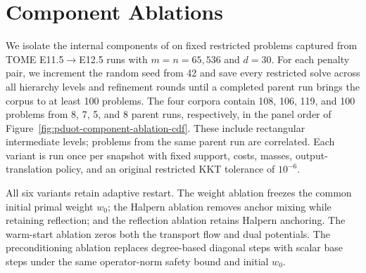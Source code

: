 \section{\subsolver Component Ablations}
\label{app:pduot-component-ablation}
We isolate the internal components of \subsolver on fixed restricted problems captured from TOME E11.5$\to$E12.5 runs with $m=n=65{,}536$ and $d=30$.
For each penalty pair, we increment the random seed from 42 and save every restricted solve across all hierarchy levels and refinement rounds until a completed parent run brings the corpus to at least 100 problems.
The four corpora contain 108, 106, 119, and 100 problems from 8, 7, 5, and 8 parent runs, respectively, in the panel order of Figure~\ref{fig:pduot-component-ablation-cdf}.
These include rectangular intermediate levels; problems from the same parent run are correlated.
Each variant is run once per snapshot with fixed support, costs, masses, output-translation policy, and an original restricted KKT tolerance of $10^{-6}$.

All six variants retain adaptive restart.
The weight ablation freezes the common initial primal weight $w_0$; the Halpern ablation removes anchor mixing while retaining reflection; and the reflection ablation retains Halpern anchoring.
The warm-start ablation zeros both the transport flow and dual potentials.
The preconditioning ablation replaces degree-based diagonal steps with scalar base steps under the same operator-norm safety bound and initial $w_0$.

